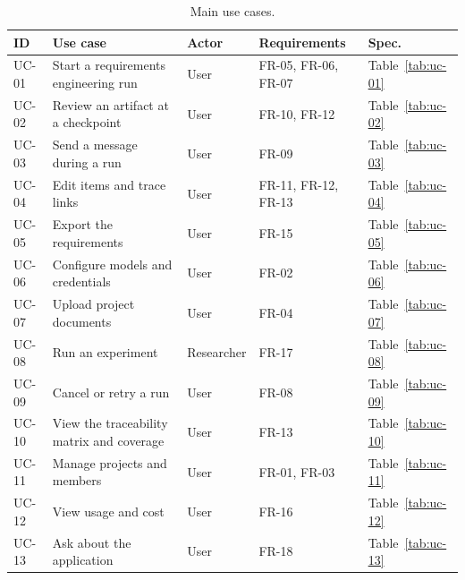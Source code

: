 \begin{table}[H]
    \centering
    \caption{Main use cases.}
    \label{tab:sd-uc-list}
    \begin{tabularx}{\linewidth}{|l|X|l|l|l|}
        \hline
        \textbf{ID} & \textbf{Use case} & \textbf{Actor} & \textbf{Requirements} & \textbf{Spec.} \\
        \hline
        UC-01 & Start a requirements engineering run & User & FR-05, FR-06, FR-07 & Table~\ref{tab:uc-01} \\
        UC-02 & Review an artifact at a checkpoint & User & FR-10, FR-12 & Table~\ref{tab:uc-02} \\
        UC-03 & Send a message during a run & User & FR-09 & Table~\ref{tab:uc-03} \\
        UC-04 & Edit items and trace links & User & FR-11, FR-12, FR-13 & Table~\ref{tab:uc-04} \\
        UC-05 & Export the requirements & User & FR-15 & Table~\ref{tab:uc-05} \\
        UC-06 & Configure models and credentials & User & FR-02 & Table~\ref{tab:uc-06} \\
        UC-07 & Upload project documents & User & FR-04 & Table~\ref{tab:uc-07} \\
        UC-08 & Run an experiment & Researcher & FR-17 & Table~\ref{tab:uc-08} \\
        UC-09 & Cancel or retry a run & User & FR-08 & Table~\ref{tab:uc-09} \\
        UC-10 & View the traceability matrix and coverage & User & FR-13 & Table~\ref{tab:uc-10} \\
        UC-11 & Manage projects and members & User & FR-01, FR-03 & Table~\ref{tab:uc-11} \\
        UC-12 & View usage and cost & User & FR-16 & Table~\ref{tab:uc-12} \\
        UC-13 & Ask about the application & User & FR-18 & Table~\ref{tab:uc-13} \\
        \hline
    \end{tabularx}
\end{table}

